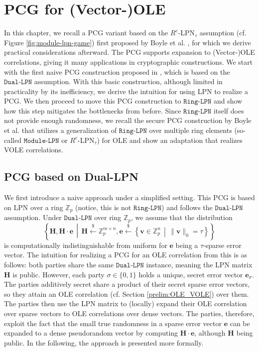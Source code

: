 \chapter{PCG for (Vector-)OLE}
\label{chapter:PCGforVOLE}
In this chapter, we recall a PCG variant based on the $R^{c}$-LPN$_{\tau}$ assumption (cf. Figure \ref{fig:module-lpn-game}) first proposed by Boyle et al. \cite{boyle2020efficient}, for which we derive practical considerations afterward. The PCG supports expansion to (Vector-)OLE correlations, giving it many applications in cryptographic constructions. We start with the first naive PCG construction proposed in \cite{boyle2019efficient}, which is based on the $\texttt{Dual-LPN}$ assumption. With this basic construction, although limited in practicality by its inefficiency, we derive the intuition for using LPN to realize a PCG. We then proceed to move this PCG construction to $\texttt{Ring-LPN}$ and show how this step mitigates the bottlenecks from before. Since $\texttt{Ring-LPN}$ itself does not provide enough randomness, we recall the secure PCG construction by Boyle et al. \cite{boyle2020efficient} that utilizes a generalization of $\texttt{Ring-LPN}$ over multiple ring elements (so-called $\texttt{Module-LPN}$ or $R^{c}$-LPN$_{\tau}$) for OLE and show an adaptation that realizes VOLE correlations.

\section{PCG based on Dual-LPN}
\label{sec:naivePCG}
We first introduce a naive approach under a simplified setting. This PCG is based on LPN over a ring $\mathbb{Z}_p$ (notice, this is not $\texttt{Ring-LPN}$) and follows the $\texttt{Dual-LPN}$ assumption. Under $\texttt{Dual-LPN}$ over ring $\mathbb{Z}_p$, we assume that the distribution
$$
\left\{ \mathbf{H}, \mathbf{H} \cdot \mathbf{e} \,\middle|\, \mathbf{H} \stackrel{\$}{\leftarrow} \mathbb{Z}_p^{m \times n}, \mathbf{e} \stackrel{\$}{\leftarrow} \left\{ \mathbf{v} \in \mathbb{Z}_p^n \,\middle|\, \|\mathbf{v}\|_0 = \tau \right\} \right\}
$$
is computationally indistinguishable from uniform for $\mathbf{e}$ being a $\tau$-sparse error vector. The intuition for realizing a PCG for an OLE correlation from this is as follows: both parties share the same $\texttt{Dual-LPN}$ instance, meaning the LPN matrix $\mathbf{H}$ is public. However, each party $\sigma \in\{0,1\}$ holds a unique, secret error vector $\mathbf{e}_\sigma$. The parties additively secret share a product of their secret sparse error vectors, so they attain an OLE correlation (cf. Section \ref{prelim:OLE_VOLE}) over them. The parties then use the LPN matrix to (locally) expand their OLE correlation over sparse vectors to OLE correlations over dense vectors. The parties, therefore, exploit the fact that the small true randomness in a sparse error vector $\mathbf{e}$ can be expanded to a dense pseudorandom vector by computing $\mathbf{H}\cdot\mathbf{e}$, although $\mathbf{H}$ being public. In the following, the approach is presented more formally.

